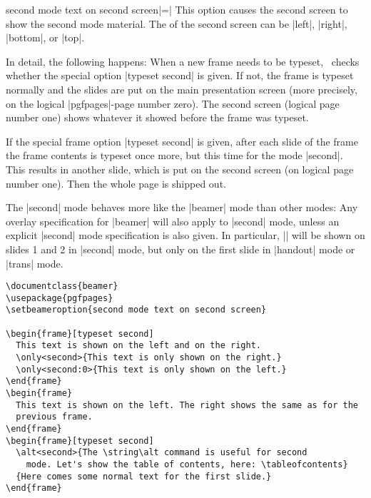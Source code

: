\begin{beameroption}{second mode text on second screen}{|=|}
  This option causes the second screen to show the second mode
  material. The  of the second screen can be |left|,
  |right|, |bottom|, or |top|.

  In detail, the following happens: When a new frame needs to be
  typeset, \beamer\ checks whether the special option |typeset second|
  is given. If not, the frame is typeset normally and the slides are
  put on the main presentation screen  (more precisely, on the logical
  |pgfpages|-page number zero). The second screen (logical page number
  one) shows whatever it showed before the frame was typeset.

  If the special frame option |typeset second| is given, after each
  slide of the frame the frame contents is typeset once more, but this
  time for the mode |second|. This results in another slide, which
  is put on the second screen (on logical page number one). Then the
  whole page is shipped out.

  The |second| mode behaves more like the |beamer| mode than
  other modes: Any overlay specification for |beamer| will also apply
  to |second| mode, unless an explicit |second| mode specification is
  also given. In particular, || will be shown on
  slides 1 and 2 in |second| mode, but only on the first slide in
  |handout| mode or |trans| mode.

  \example
\begin{verbatim}
\documentclass{beamer}
\usepackage{pgfpages}
\setbeameroption{second mode text on second screen}

\begin{frame}[typeset second]
  This text is shown on the left and on the right.
  \only<second>{This text is only shown on the right.}
  \only<second:0>{This text is only shown on the left.}
\end{frame}
\begin{frame}
  This text is shown on the left. The right shows the same as for the
  previous frame.
\end{frame}
\begin{frame}[typeset second]
  \alt<second>{The \string\alt command is useful for second
    mode. Let's show the table of contents, here: \tableofcontents}
  {Here comes some normal text for the first slide.}
\end{frame}

\end{verbatim}


\end{beameroption}
